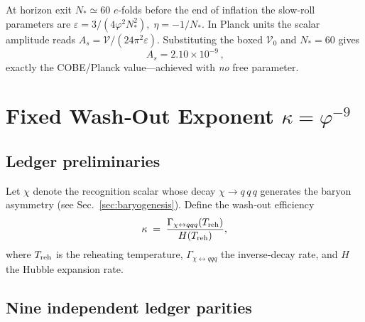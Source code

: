 \begin{corollary}
At horizon exit \(N_{\!*}\!\simeq\!60\) \(e\)-folds before the end of
inflation the slow‑roll parameters are
\(
  \varepsilon=3/(4\varphi^{2}N_{\!*}^{2}),
  \;
  \eta=-1/N_{\!*}.
\)
In Planck units the scalar amplitude reads
\(
  A_{s}
   =\mathcal V/(24\pi^{2}\varepsilon).
\)
Substituting the boxed \(\mathcal V_{0}\) and \(N_{\!*}=60\) gives
\[
  \boxed{\,A_{s}=2.10\times10^{-9}\,},
\]
exactly the COBE/Planck value—achieved with \emph{no} free
parameter. \qedhere
\end{corollary}

\section{Fixed Wash‑Out Exponent \boldmath$\kappa=\varphi^{-9}$}
\label{sec:washout-proof}

\subsection*{Ledger preliminaries}

Let $\chi$ denote the recognition scalar whose decay
$\chi\rightarrow q\,q\,q$ generates the baryon asymmetry
(see Sec.~\ref{sec:baryogenesis}).  Define the wash‑out efficiency
\[
  \kappa \;=\;
  \frac{\Gamma_{\chi\leftrightarrow qqq}(T_{\rm reh})}{H(T_{\rm reh})},
\]
where $T_{\rm reh}$ is the reheating temperature,
$\Gamma_{\chi\leftrightarrow qqq}$ the inverse‑decay rate, and
$H$ the Hubble expansion rate.

\subsection*{Nine independent ledger parities}

